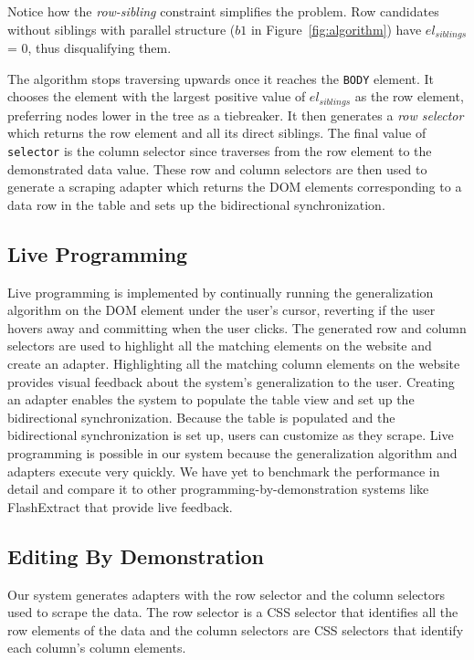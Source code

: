 \documentclass[sigconf,10pt]{acmart}
\begin{document}
Notice how the \emph{row-sibling} constraint simplifies the problem. Row
candidates without siblings with parallel structure (\(b1\) in
Figure~\ref{fig:algorithm}) have \(el_{siblings}\) = 0, thus
disqualifying them.

The algorithm stops traversing upwards once it reaches the \texttt{BODY}
element. It chooses the element with the largest positive value of
\(el_{siblings}\) as the row element, preferring nodes lower in the tree
as a tiebreaker. It then generates a \emph{row selector} which returns
the row element and all its direct siblings. The final value of
\texttt{selector} is the column selector since traverses from the row
element to the demonstrated data value. These row and column selectors
are then used to generate a scraping adapter which returns the DOM
elements corresponding to a data row in the table and sets up the
bidirectional synchronization.

\hypertarget{live-programming}{%
\subsection{Live Programming}\label{live-programming}}

Live programming is implemented by continually running the
generalization algorithm on the DOM element under the user's cursor,
reverting if the user hovers away and committing when the user clicks.
The generated row and column selectors are used to highlight all the
matching elements on the website and create an adapter. Highlighting all
the matching column elements on the website provides visual feedback
about the system's generalization to the user. Creating an adapter
enables the system to populate the table view and set up the
bidirectional synchronization. Because the table is populated and the
bidirectional synchronization is set up, users can customize as they
scrape. Live programming is possible in our system because the
generalization algorithm and adapters execute very quickly. We have yet
to benchmark the performance in detail and compare it to other
programming-by-demonstration systems like FlashExtract \citep{le2014}
that provide live feedback.

\hypertarget{editing-by-demonstration}{%
\subsection{Editing By Demonstration}\label{editing-by-demonstration}}

Our system generates adapters with the row selector and the column
selectors used to scrape the data. The row selector is a CSS selector
that identifies all the row elements of the data and the column
selectors are CSS selectors that identify each column's column elements.
\end{document}
